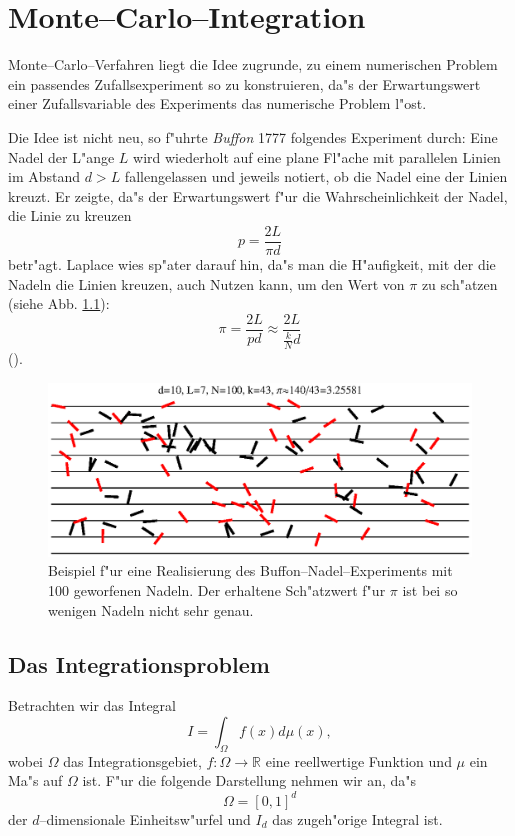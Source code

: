 	\chapter{Monte--Carlo--Integration}
	Monte--Carlo--Verfahren liegt die Idee zugrunde, zu einem numerischen Problem ein passendes Zufallsexperiment so zu konstruieren, da"s der Erwartungswert einer Zufallsvariable des Experiments das numerische Problem l"ost.
	
	Die Idee ist nicht neu, so f"uhrte {\em Buffon} 1777 folgendes Experiment durch: Eine Nadel der L"ange $L$ wird wiederholt auf eine plane Fl"ache mit parallelen Linien im Abstand $d>L$ fallengelassen und jeweils notiert, ob die Nadel eine der Linien kreuzt. Er zeigte, da"s der Erwartungswert f"ur die Wahrscheinlichkeit der Nadel, die Linie zu kreuzen $$p=\frac{2L}{\pi d}$$ betr"agt. Laplace wies sp"ater darauf hin, da"s  man die H"aufigkeit, mit der die Nadeln die Linien kreuzen, auch Nutzen kann, um den Wert von $\pi$ zu sch"atzen (siehe Abb. \ref{fig:buffon}): $$\pi=\frac{2L}{p d}\approx \frac{2L}{\frac{k}{N}d}$$
	().
	\begin{figure}
		\centering
		\includegraphics[height=0.3\textheight]{buffonsneedles.eps}
		\caption{Beispiel f"ur eine Realisierung des Buffon--Nadel--Experiments mit 100 geworfenen Nadeln. Der erhaltene Sch"atzwert f"ur $\pi$ ist bei so wenigen Nadeln nicht sehr genau.}
		\label{fig:buffon}
	\end{figure}
	
	\section{Das Integrationsproblem}\label{subsec:integrationsproblem}
	Betrachten wir das Integral
	\begin{equation}
		I=\int_\Omega f(x) d\mu(x),
		\label{eq:integration_problem}
	\end{equation}
	wobei $\Omega$ das Integrationsgebiet, $f : \Omega \to \mathbb{R}$ eine reellwertige Funktion und $\mu$ ein Ma"s auf $\Omega$ ist. F"ur die folgende Darstellung nehmen wir an, da"s $$\Omega=[0,1]^d$$ der $d$--dimensionale Einheitsw"urfel und $I_d$ das zugeh"orige Integral ist.
